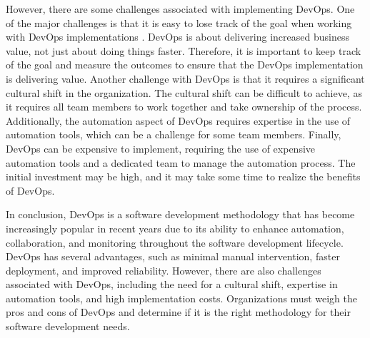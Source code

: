 However, there are some challenges associated with implementing DevOps. One of the major challenges is that it is easy to lose track of the goal when working with DevOps implementations \cite{joakim}. DevOps is about delivering increased business value, not just about doing things faster. Therefore, it is important to keep track of the goal and measure the outcomes to ensure that the DevOps implementation is delivering value. Another challenge with DevOps is that it requires a significant cultural shift in the organization. The cultural shift can be difficult to achieve, as it requires all team members to work together and take ownership of the process. Additionally, the automation aspect of DevOps requires expertise in the use of automation tools, which can be a challenge for some team members. Finally, DevOps can be expensive to implement, requiring the use of expensive automation tools and a dedicated team to manage the automation process. The initial investment may be high, and it may take some time to realize the benefits of DevOps.

In conclusion, DevOps is a software development methodology that has become increasingly popular in recent years due to its ability to enhance automation, collaboration, and monitoring throughout the software development lifecycle. DevOps has several advantages, such as minimal manual intervention, faster deployment, and improved reliability. However, there are also challenges associated with DevOps, including the need for a cultural shift, expertise in automation tools, and high implementation costs. Organizations must weigh the pros and cons of DevOps and determine if it is the right methodology for their software development needs.